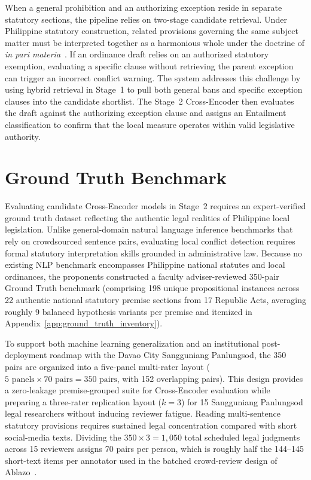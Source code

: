         When a general prohibition and an authorizing exception reside in separate statutory sections, the pipeline relies on two-stage candidate retrieval. Under Philippine statutory construction, related provisions governing the same subject matter must be interpreted together as a harmonious whole under the doctrine of \textit{in pari materia}~\cite{agpalo2009statutory}. If an ordinance draft relies on an authorized statutory exemption, evaluating a specific clause without retrieving the parent exception can trigger an incorrect conflict warning. The system addresses this challenge by using hybrid retrieval in Stage~1 to pull both general bans and specific exception clauses into the candidate shortlist. The Stage~2 Cross-Encoder then evaluates the draft against the authorizing exception clause and assigns an Entailment classification to confirm that the local measure operates within valid legislative authority.

    \section{Ground Truth Benchmark}
    \label{sec:ground_truth_construction}
    Evaluating candidate Cross-Encoder models in Stage~2 requires an expert-verified ground truth dataset reflecting the authentic legal realities of Philippine local legislation. Unlike general-domain natural language inference benchmarks that rely on crowdsourced sentence pairs, evaluating local conflict detection requires formal statutory interpretation skills grounded in administrative law. Because no existing NLP benchmark encompasses Philippine national statutes and local ordinances, the proponents constructed a faculty adviser-reviewed 350-pair Ground Truth benchmark (comprising 198 unique propositional instances across 22 authentic national statutory premise sections from 17 Republic Acts, averaging roughly 9 balanced hypothesis variants per premise and itemized in Appendix~\ref{app:ground_truth_inventory}).

    To support both machine learning generalization and an institutional post-deployment roadmap with the Davao City Sangguniang Panlungsod, the 350 pairs are organized into a five-panel multi-rater layout ($5\text{ panels} \times 70\text{ pairs} = 350\text{ pairs}$, with 152 overlapping pairs). This design provides a zero-leakage premise-grouped suite for Cross-Encoder evaluation while preparing a three-rater replication layout ($k = 3$) for 15 Sangguniang Panlungsod legal researchers without inducing reviewer fatigue. Reading multi-sentence statutory provisions requires sustained legal concentration compared with short social-media texts. Dividing the $350 \times 3 = 1{,}050$ total scheduled legal judgments across 15 reviewers assigns 70 pairs per person, which is roughly half the 144--145 short-text items per annotator used in the batched crowd-review design of Ablazo~\cite{ablazo2019designing}.

